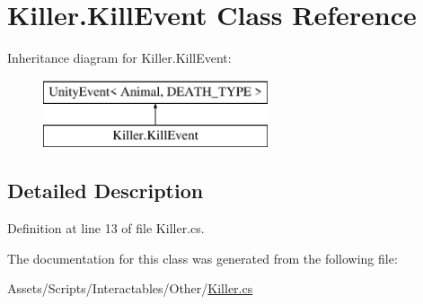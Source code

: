 \hypertarget{class_killer_1_1_kill_event}{}\section{Killer.\+Kill\+Event Class Reference}
\label{class_killer_1_1_kill_event}
Inheritance diagram for Killer.\+Kill\+Event\+:\begin{figure}[H]
\begin{center}
\leavevmode
\includegraphics[height=2.000000cm]{class_killer_1_1_kill_event}
\end{center}
\end{figure}


\subsection{Detailed Description}


Definition at line 13 of file Killer.\+cs.



The documentation for this class was generated from the following file\+:\begin{DoxyCompactItemize}
\item 
Assets/\+Scripts/\+Interactables/\+Other/\mbox{\hyperlink{_killer_8cs}{Killer.\+cs}}\end{DoxyCompactItemize}
